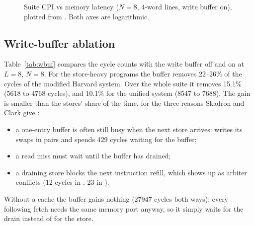 \begin{figure}[t]
  \centering
  \caption{Suite CPI vs memory latency ($N=8$, 4-word lines, write buffer on), plotted from
  . Both axes are logarithmic.}
  \label{fig:cpi}
\end{figure}

\subsection{Write-buffer ablation}
Table~\ref{tab:wbuf} compares the cycle counts with the write buffer off and on at $L=8$,
$N=8$. For the store-heavy programs the buffer removes 22--26\% of the cycles of the modified
Harvard system. Over the whole suite it removes 15.1\% (5618 to 4768 cycles), and 10.1\% for the
unified system (8547 to 7688). The gain is smaller than the stores' share of the time, for the
three reasons Skadron and Clark give \cite{skadron1997}:
\begin{itemize}
  \item a one-entry buffer is often still busy when the next store arrives: 
        writes its swaps in pairs and spends 429 cycles waiting for the buffer;
  \item a read miss must wait until the buffer has drained;
  \item a draining store blocks the next instruction refill, which shows up as arbiter
        conflicts (12 cycles in , 23 in ).
\end{itemize}
Without a cache the buffer gains nothing (27947 cycles both ways): every following fetch needs
the same memory port anyway, so it simply waits for the drain instead of for the store.

